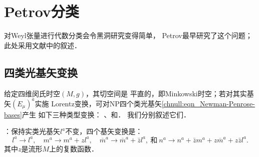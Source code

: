 
\section{Petrov分类}
对Weyl张量进行代数分类会令黑洞研究变得简单，
Petrov最早研究了这个问题；
此处采用文献\parencite[\S 1.9]{chandrasekhar-1983}中的叙述．

\subsection{四类光基矢变换}
给定四维闵氏时空$(M,g)$，其切空间是
平直的，即Minkowski时空；若对其实基矢$(E_\mu)^a$实施
Lorentz变换，可对NP四个类光基矢\eqref{chnull:eqn_Newman-Penrose-bases}产生
如下三种类型变换：
、和．
我们分别叙述它们．

\noindent{}：保持实类光基矢$l^a$不变，四个基矢变换是：
\begin{equation*}
    l^a\to l^a,\quad m^a \to m^a + z l^a, \quad \overline{m}^a \to \overline{m}^a + \bar{z} l^a,
    \ \text{和}\ n^a \to n^a + \bar{z} m^a + z \overline{m}^a + z\bar{z} l^a .
\end{equation*}
其中$z$是流形$M$上的复数函数．


